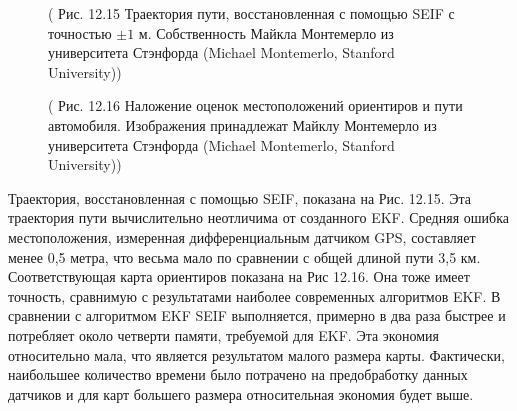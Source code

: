 \documentclass[10pt,a4paper]{article}
\begin{document}
\begin{figure}[H]
	\caption{ ( Рис. 12.15 Траектория пути, восстановленная с помощью SEIF с точностью $\pm1$ м. Собственность Майкла Монтемерло из университета Стэнфорда (Michael Montemerlo, Stanford University)) }
	\label{fig:1215orig}
\end{figure}

\begin{figure}[H]
	\caption{ ( Рис. 12.16 Наложение оценок местоположений ориентиров и пути автомобиля. Изображения принадлежат Майклу Монтемерло из университета Стэнфорда (Michael Montemerlo, Stanford University)) }
	\label{fig:1216orig}
\end{figure}

Траектория, восстановленная с помощью SEIF, показана на Рис. 12.15. Эта траектория пути вычислительно неотличима от созданного EKF. Средняя ошибка местоположения, измеренная дифференциальным датчиком GPS, составляет менее 0,5 метра, что весьма мало по сравнении с общей длиной пути 3,5 км. Соответствующая карта ориентиров показана на Рис 12.16. Она тоже имеет точность, сравнимую с результатами наиболее современных алгоритмов EKF. В сравнении с алгоритмом EKF  SEIF выполняется, примерно в два раза быстрее и потребляет около четверти памяти, требуемой для EKF. Эта экономия относительно мала, что является результатом малого размера карты. Фактически, наибольшее количество времени было потрачено на предобработку данных датчиков и для карт большего размера относительная экономия будет выше.\\
\end{document}
